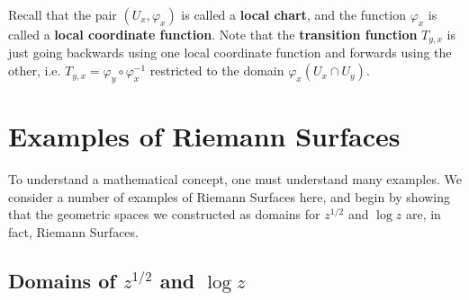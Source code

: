 \documentclass[12pt]{book}%
\theoremstyle{plain}
\theoremstyle{definition}
\theoremstyle{remark}
\begin{document}
\begin{figure}
\label{riemannSurfaceManifoldPic}
\end{figure}


Recall that the pair $(U_x, \varphi_x)$ is called a \textbf{local chart}, and the function $\varphi_x$ is called a \textbf{local coordinate function}. Note that the \textbf{transition function} $T_{y,x}$ is just going backwards using one local coordinate function and forwards using the other, i.e. $T_{y,x} = \varphi_y \circ \varphi_x^{-1}$ restricted to the domain $\varphi_x(U_x \cap U_y)$.

\section{Examples of Riemann Surfaces}

To understand a mathematical concept, one must understand many examples. We consider a number of examples of Riemann Surfaces here, and begin by showing that the geometric spaces we constructed as domains for $z^{1/2}$ and $\log z$ are, in fact, Riemann Surfaces.

\subsection{Domains of $z^{1/2}$ and $\log z$}
\end{document}
